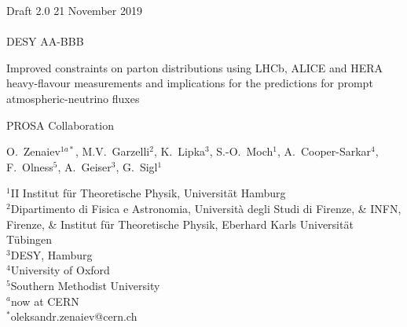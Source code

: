 \documentclass[12pt]{article}
\begin{document}
\begin{titlepage}
\noindent
Draft 2.0  \hfill 21 November 2019\\
\\
DESY AA-BBB %
\\

\vspace{1.0cm}

\begin{center}
  {\bf 

\large

Improved constraints on parton distributions using LHCb, ALICE and HERA heavy-flavour measurements and implications for the predictions for prompt atmospheric-neutrino fluxes 
  }
  \vspace{1.0cm}

  {\large
    PROSA Collaboration
  }\\

  \vspace{0.4cm}

\end{center}
\noindent
O.~Zenaiev$^{1a*}$, \mbox{M.V.~Garzelli}$^{2}$, K.~Lipka$^{3}$, \mbox{S.-O.~Moch}$^{1}$, A.~Cooper-Sarkar$^{4}$, F.~Olness$^{5}$, A.~Geiser$^{3}$, G.~Sigl$^{1}$\\


\noindent


{\footnotesize{
		\noindent
		$^{1}$II Institut f\"ur Theoretische Physik, Universit\"at Hamburg\\
		$^{2}$Dipartimento di Fisica e Astronomia, Universit\`a degli Studi di Firenze, \& INFN, Firenze, \& Institut f\"ur Theoretische Physik, Eberhard Karls Universit\"at T\"ubingen\\
		$^{3}${DESY, Hamburg}\\
		$^{4}$University of Oxford\\
		$^{5}$Southern Methodist University\\
		$^{a}$now at CERN\\
    
    \noindent
		$^{*}$oleksandr.zenaiev@cern.ch\\
	}
}


\end{titlepage}
\end{document}
